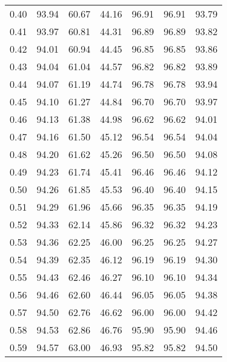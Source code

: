 \begin{tabular}{|c|c|c|c|c|c|c|}
      0.40 &     93.94 &     60.67 &      44.16 &   96.91 &      96.91 &         93.79 \\
      0.41 &     93.97 &     60.81 &      44.31 &   96.89 &      96.89 &         93.82 \\
      0.42 &     94.01 &     60.94 &      44.45 &   96.85 &      96.85 &         93.86 \\
      0.43 &     94.04 &     61.04 &      44.57 &   96.82 &      96.82 &         93.89 \\
      0.44 &     94.07 &     61.19 &      44.74 &   96.78 &      96.78 &         93.94 \\
      0.45 &     94.10 &     61.27 &      44.84 &   96.70 &      96.70 &         93.97 \\
      0.46 &     94.13 &     61.38 &      44.98 &   96.62 &      96.62 &         94.01 \\
      0.47 &     94.16 &     61.50 &      45.12 &   96.54 &      96.54 &         94.04 \\
      0.48 &     94.20 &     61.62 &      45.26 &   96.50 &      96.50 &         94.08 \\
      0.49 &     94.23 &     61.74 &      45.41 &   96.46 &      96.46 &         94.12 \\
      0.50 &     94.26 &     61.85 &      45.53 &   96.40 &      96.40 &         94.15 \\
      0.51 &     94.29 &     61.96 &      45.66 &   96.35 &      96.35 &         94.19 \\
      0.52 &     94.33 &     62.14 &      45.86 &   96.32 &      96.32 &         94.23 \\
      0.53 &     94.36 &     62.25 &      46.00 &   96.25 &      96.25 &         94.27 \\
      0.54 &     94.39 &     62.35 &      46.12 &   96.19 &      96.19 &         94.30 \\
      0.55 &     94.43 &     62.46 &      46.27 &   96.10 &      96.10 &         94.34 \\
      0.56 &     94.46 &     62.60 &      46.44 &   96.05 &      96.05 &         94.38 \\
      0.57 &     94.50 &     62.76 &      46.62 &   96.00 &      96.00 &         94.42 \\
      0.58 &     94.53 &     62.86 &      46.76 &   95.90 &      95.90 &         94.46 \\
      0.59 &     94.57 &     63.00 &      46.93 &   95.82 &      95.82 &         94.50 \\

\end{tabular}
